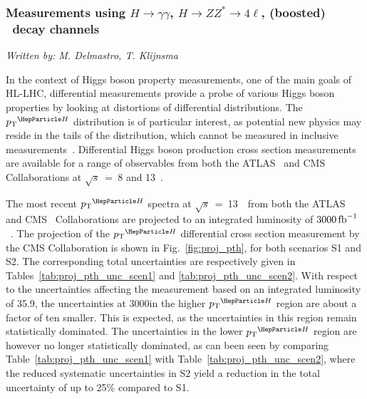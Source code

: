 \subsubsection{Measurements using $H \to \gamma\gamma$, $H \to ZZ^* \to 4\ell$, (boosted) \Hbb\ decay channels}
\label{sec:diffxs}
\begin{center}{\it Written by: M. Delmastro, T. Klijnsma} \end{center}


\noindent In the context of Higgs boson property measurements, one of the main goals of HL-LHC, differential measurements provide a probe of various Higgs boson properties by looking at distortions of differential distributions.
% 
The $\pTH$ distribution is of particular interest, as potential new physics may reside in the tails of the distribution, which cannot be measured in inclusive measurements~\cite{%
Khachatryan:2016vau,%
Aad:2015zhl,%
CMS:2018lkl%
}.
% 
Differential Higgs boson production cross section measurements are available for a range of observables from both the ATLAS~\cite{%
Aad:2014lwa,%
Aad:2014tca,%
Aad:2016lvc,%
Aaboud:2018xdt,%
Aaboud:2017oem,%
Aaboud:2018ezd%
} and CMS~\cite{%
Khachatryan:2015rxa,%
Khachatryan:2015yvw,%
Khachatryan:2016vnn,%
Sirunyan:2018kta,%
Sirunyan:2017exp,
CMS-PAS-HIG-17-028%
} Collaborations at $\sqrt{s}$~=~8 and 13~\UTeV.

The most recent $\pTH$ spectra at $\sqrt{s}$~=~13~\UTeV\ from both the ATLAS~\cite{Aaboud:2018ezd} and CMS~\cite{Sirunyan:2018sgc} Collaborations are projected to an integrated luminosity of $3000\mbox{\ensuremath{\,\text{fb}^\text{$-$1}}}$~\cite{CMS-PAS-FTR-18-011, ATL-PHYS-PUB-2018-040}.
The projection of the $\pTH$ differential cross section measurement by the CMS Collaboration is shown in Fig.~\ref{fig:proj_pth}, for both scenarios S1 and S2. The corresponding total uncertainties are respectively given in Tables~\ref{tab:proj_pth_unc_scen1} and \ref{tab:proj_pth_unc_scen2}. With respect to the uncertainties affecting the measurement based on an integrated luminosity of 35.9\fbinv, the uncertainties at 3000\fbinv in the higher $\pTH$ region are about a factor of ten smaller. This is expected, as the uncertainties in this region remain statistically dominated.
The uncertainties in the lower $\pTH$ region are however no longer statistically dominated, as can been seen by comparing Table~\ref{tab:proj_pth_unc_scen1} with Table~\ref{tab:proj_pth_unc_scen2}, where the reduced systematic uncertainties in S2 yield a reduction in the total uncertainty of up to 25\% compared to S1.


